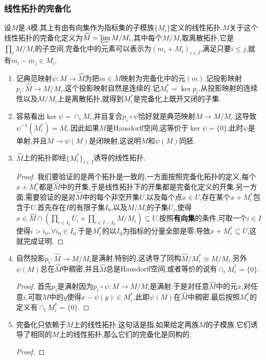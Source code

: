 \subsubsection{线性拓扑的完备化}

设$M$是$A$模,其上有由有向集作为指标集的子模族$\{M_i\}$定义的线性拓扑.$M$关于这个线性拓扑的完备化定义为$\widehat{M}=\varprojlim M/M_i$,其中每个$M/M_i$取离散拓扑,它是$\prod_iM/M_i$的子空间.完备化中的元素可以表示为$(m_i+M_i)_{i\in I}$,满足只要$i\le j$,就有$m_i-m_j\in M_i$.
\begin{enumerate}
	\item 记典范映射$\psi:M\to\widehat{M}$为把$m\in M$映射为完备化中的元$(m)$.记投影映射$p_i:\widehat{M}\to M/M_i$,这个投影映射自然是连续的.记$M^*_i=\ker p_i$,从投影映射的连续性以及$M/M_i$上是离散拓扑,就得到$M^*_i$是完备化上既开又闭的子集.
	\item 容易看出$\ker\psi=\cap_iM_i$,并且复合$p_i\circ\psi$恰好就是典范映射$M\to M/M_i$,这导致$\psi^{-1}(M_i^*)=M_i$.因此如果$M$是Hausdorff空间,这等价于$\ker\psi=\{0\}$,此时$\psi$是单射,并且$M\to\psi(M)$是闭映射,这说明$M$和$\psi(M)$同胚.
	\item $\widehat{M}$上的拓扑即经$\{M_i^*\}_{i\in I}$诱导的线性拓扑.
	\begin{proof}
		
		我们要验证的是两个拓扑是一致的,一方面按照完备化拓扑的定义,每个$x+M_i^*$都是$\widehat{M}$中的开集,于是线性拓扑下的开集都是完备化定义的开集.另一方面,需要验证的是对$\widehat{M}$中的每个非空开集$U$,以及每个点$x\in U$,存在某个$x+M_i^*$包含于$U$.首先存在$I$的有限子集$I_0$,以及$M/M_i$的子集$U_i$,使得$x\in\widehat{M}\cap\left(\prod_{i\in I_0}U_i\times\prod_{i\in I-I_0}M/M_i\right)\subseteq U$.按照\textbf{有向集}的条件,可取一个$i\in I$使得$i>i_0,\forall i_0\in I_0$.于是$M_i^*$的以$I_0$为指标的分量全部是零,导致$x+M_i^*\subseteq U$,这就完成证明.
	\end{proof}
	\item 自然投影$p_i:\widehat{M}\to M/M_i$是满射,特别的,这诱导了同构$\widehat{M}/M_i^*\cong M/M_i$.另外$\psi(M)$总在$\widehat{M}$中稠密,并且$\widehat{M}$总是Hausdorff空间,或者等价的说有$\cap_iM_i^*=\{0\}$.
	\begin{proof}
		
		首先$p_i$是满射因为$p_i\circ\psi:M\to M/M_i$是满射.于是对任意$\widehat{M}$中的元$x$,对任意$i$,可取$M$中的$y$使得$x-\psi(y)\in M_i^*$,此即$\psi(M)$在$\widehat{M}$中稠密.最后按照$M_i^*$的定义有$\cap_iM_i^*=\{0\}$.
	\end{proof}
	\item 完备化只依赖于$M$上的线性拓扑.这句话是指,如果给定两族$M$的子模族,它们诱导了相同的$M$上的线性拓扑,那么它们的完备化是同构的.
	\begin{proof}
		

\end{proof}
\end{enumerate}
